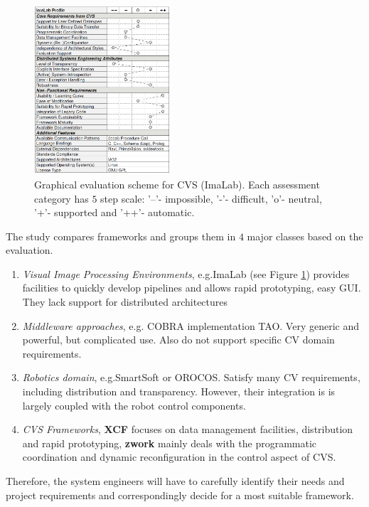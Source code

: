 \begin{figure}[H]
\begin{center}
\includegraphics[width=0.45\textwidth]{fig/CVSEval}
\end{center}
\caption{Graphical evaluation scheme for CVS (ImaLab). Each assessment category has $5$ step scale: '--'- impossible, '-'- difficult, 'o'- neutral, '+'- supported and '++'- automatic.}
\label{fig:cvseval}
\end{figure}

The study compares frameworks and groups them in $4$ major classes based on the evaluation.  

\begin{enumerate}
\item{{\em Visual Image Processing Environments}, e.g.ImaLab (see Figure \ref{fig:cvseval}) provides facilities to quickly develop pipelines and allows rapid prototyping, easy GUI. They lack support for distributed architectures}
\item{{\em Middleware approaches}, e.g. COBRA implementation TAO. Very generic and powerful, but complicated use. Also do not support specific CV domain requirements.}
\item{{\em Robotics domain}, e.g.SmartSoft or OROCOS. Satisfy many CV requirements, including distribution and transparency. However, their integration is is largely coupled with the robot control components.}
\item{{\em CVS Frameworks}, {\bf XCF} \cite{Wrede2004-AXB} focuses on data management
facilities, distribution and rapid prototyping, {\bf zwork} \cite{ponweiser2003reusable} mainly deals with the programmatic coordination and
dynamic reconfiguration in the control aspect of CVS.}
\end{enumerate}
Therefore, the system engineers will have to carefully identify their needs and project requirements and correspondingly decide for a most suitable framework.

